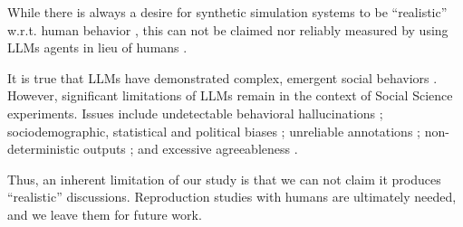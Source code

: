 While there is always a desire for synthetic simulation systems to be ``realistic'' w.r.t. human behavior \citet{grossman_2023, tornberg_2023, argyle2023}, this can not be claimed nor reliably measured by using \acp{LLM} agents in lieu of humans \citep{rossi_2024}.

It is true that \acp{LLM} have demonstrated complex, emergent social behaviors \cite{Park2023GenerativeAI, demarzo_2023, leng_2024, abdelnabi_negotiations, abramski_2023, hewitt2024predicting, park2024generativeagentsimulations1000}. However, significant limitations of \acp{LLM} remain in the context of Social Science experiments. Issues include undetectable behavioral hallucinations \cite{rossi_2024}; sociodemographic, statistical and political biases \cite{anthis_2025,hewitt2024predicting,rossi_2024, Taubenfeld2024SystematicBI}; unreliable annotations \cite{jansen_2023,bisbee_2023,neumann_2025, Gligoric2024CanUL}; non-deterministic outputs \cite{atil_2025, bisbee_2023}; and excessive agreeableness \cite{Park2023GenerativeAI, anthis_2025, rossi_2024}.

Thus, an inherent limitation of our study is that we can not claim it produces ``realistic'' discussions. Reproduction studies with humans are ultimately needed, and we leave them for future work.




